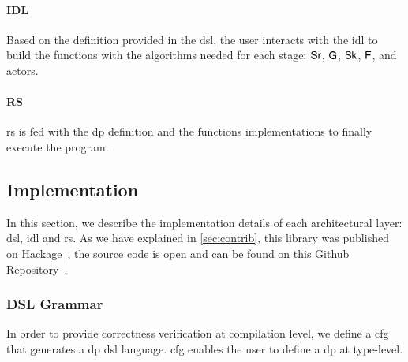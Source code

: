 \paragraph{IDL} Based on the definition provided in the \acrshort{dsl}, the user interacts with the \acrshort{idl} to build the functions with the algorithms needed for each stage: $\mathsf{Sr}$, $\mathsf{G}$, $\mathsf{Sk}$, $\mathsf{F}$, and actors. 

\paragraph{RS} \acrshort{rs} is fed with the \acrshort{dp} definition and the functions implementations to finally execute the program. 

\subsection{Implementation}
In this section, we describe the implementation details of each architectural layer: \acrshort{dsl}, \acrshort{idl} and \acrshort{rs}.
As we have explained in \autoref{sec:contrib}, this library was published on Hackage~\cite{dynamic-pipeline}, the source code is open and can be found on this Github Repository~\cite{dynamic-pipeline-git}.

\subsubsection{DSL Grammar}\label{sub:sec:dsl-gram}
In order to provide correctness verification at compilation level, we define a \acrfull{cfg} that generates a \acrshort{dp} \acrshort{dsl} language. 
\acrshort{cfg} enables the user to define a \acrshort{dp} at type-level. 

